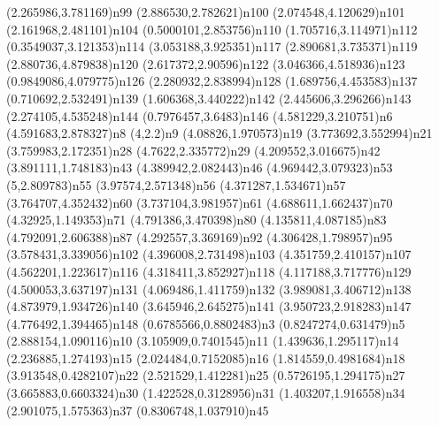 \dotnode[](2.265986,3.781169){n99}
\dotnode[](2.886530,2.782621){n100}
\dotnode[](2.074548,4.120629){n101}
\dotnode[](2.161968,2.481101){n104}
\dotnode[](0.5000101,2.853756){n110}
\dotnode[](1.705716,3.114971){n112}
\dotnode[](0.3549037,3.121353){n114}
\dotnode[](3.053188,3.925351){n117}
\dotnode[](2.890681,3.735371){n119}
\dotnode[](2.880736,4.879838){n120}
\dotnode[](2.617372,2.90596){n122}
\dotnode[](3.046366,4.518936){n123}
\dotnode[](0.9849086,4.079775){n126}
\dotnode[](2.280932,2.838994){n128}
\dotnode[](1.689756,4.453583){n137}
\dotnode[](0.710692,2.532491){n139}
\dotnode[](1.606368,3.440222){n142}
\dotnode[](2.445606,3.296266){n143}
\dotnode[](2.274105,4.535248){n144}
\dotnode[](0.7976457,3.6483){n146}
\dotnode[fillcolor=gray](4.581229,3.210751){n6}
\dotnode[](4.591683,2.878327){n8}
\dotnode[](4,2.2){n9}
\dotnode[](4.08826,1.970573){n19}
\dotnode[](3.773692,3.552994){n21}
\dotnode[](3.759983,2.172351){n28}
\dotnode[](4.7622,2.335772){n29}
\dotnode[](4.209552,3.016675){n42}
\dotnode[](3.891111,1.748183){n43}
\dotnode[](4.389942,2.082443){n46}
\dotnode[](4.969442,3.079323){n53}
\dotnode[](5,2.809783){n55}
\dotnode[](3.97574,2.571348){n56}
\dotnode[](4.371287,1.534671){n57}
\dotnode[](3.764707,4.352432){n60}
\dotnode[](3.737104,3.981957){n61}
\dotnode[](4.688611,1.662437){n70}
\dotnode[](4.32925,1.149353){n71}
\dotnode[](4.791386,3.470398){n80}
\dotnode[](4.135811,4.087185){n83}
\dotnode[](4.792091,2.606388){n87}
\dotnode[](4.292557,3.369169){n92}
\dotnode[](4.306428,1.798957){n95}
\dotnode[](3.578431,3.339056){n102}
\dotnode[](4.396008,2.731498){n103}
\dotnode[](4.351759,2.410157){n107}
\dotnode[](4.562201,1.223617){n116}
\dotnode[](4.318411,3.852927){n118}
\dotnode[](4.117188,3.717776){n129}
\dotnode[](4.500053,3.637197){n131}
\dotnode[](4.069486,1.411759){n132}
\dotnode[](3.989081,3.406712){n138}
\dotnode[](4.873979,1.934726){n140}
\dotnode[](3.645946,2.645275){n141}
\dotnode[](3.950723,2.918283){n147}
\dotnode[](4.776492,1.394465){n148}
\dotnode[](0.6785566,0.8802483){n3}
\dotnode[](0.8247274,0.631479){n5}
\dotnode[](2.888154,1.090116){n10}
\dotnode[](3.105909,0.7401545){n11}
\dotnode[](1.439636,1.295117){n14}
\dotnode[](2.236885,1.274193){n15}
\dotnode[](2.024484,0.7152085){n16}
\dotnode[](1.814559,0.4981684){n18}
\dotnode[](3.913548,0.4282107){n22}
\dotnode[](2.521529,1.412281){n25}
\dotnode[fillcolor=gray](0.5726195,1.294175){n27}
\dotnode[](3.665883,0.6603324){n30}
\dotnode[](1.422528,0.3128956){n31}
\dotnode[](1.403207,1.916558){n34}
\dotnode[](2.901075,1.575363){n37}
\dotnode[](0.8306748,1.037910){n45}
